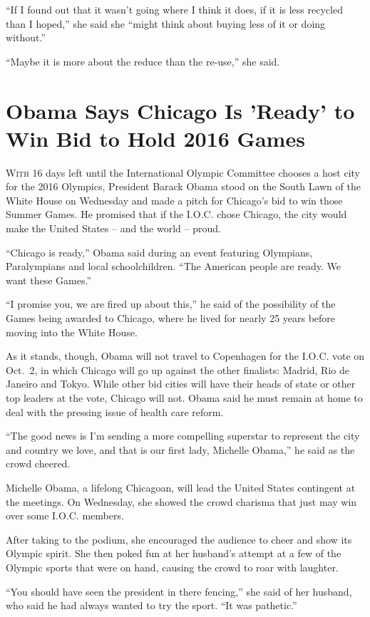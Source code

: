 ﻿\documentclass[12pt]{article}
\begin{document}
``If I found out that it wasn't going where I think it does, if it is less recycled than I hoped,''
she said she ``might think about buying less of it or doing without.''

``Maybe it is more about the reduce than the re-use,'' she said.

\section{Obama Says Chicago Is 'Ready' to Win Bid to Hold 2016 Games}

\lettrine{W}{ith} 16 days left until the International Olympic Committee chooses a host city for the
2016 Olympics, President Barack Obama stood on the South Lawn of the White House on Wednesday and
made a pitch for Chicago's bid to win those Summer Games. He promised that if the I.O.C. chose
Chicago, the city would make the United States -- and the world -- proud.

``Chicago is ready,'' Obama said during an event featuring Olympians, Paralympians and local
schoolchildren. ``The American people are ready. We want these Games.''

``I promise you, we are fired up about this,'' he said of the possibility of the Games being awarded
to Chicago, where he lived for nearly 25 years before moving into the White House.

As it stands, though, Obama will not travel to Copenhagen for the I.O.C. vote on Oct.~2, in which
Chicago will go up against the other finalists: Madrid, Rio de Janeiro and Tokyo. While other bid
cities will have their heads of state or other top leaders at the vote, Chicago will not. Obama said
he must remain at home to deal with the pressing issue of health care reform.

``The good news is I'm sending a more compelling superstar to represent the city and country we
love, and that is our first lady, Michelle Obama,'' he said as the crowd cheered.

Michelle Obama, a lifelong Chicagoan, will lead the United States contingent at the meetings. On
Wednesday, she showed the crowd charisma that just may win over some I.O.C. members.

After taking to the podium, she encouraged the audience to cheer and show its Olympic spirit. She
then poked fun at her husband's attempt at a few of the Olympic sports that were on hand, causing
the crowd to roar with laughter.

``You should have seen the president in there fencing,'' she said of her husband, who said he had
always wanted to try the sport. ``It was pathetic.''
\end{document}
